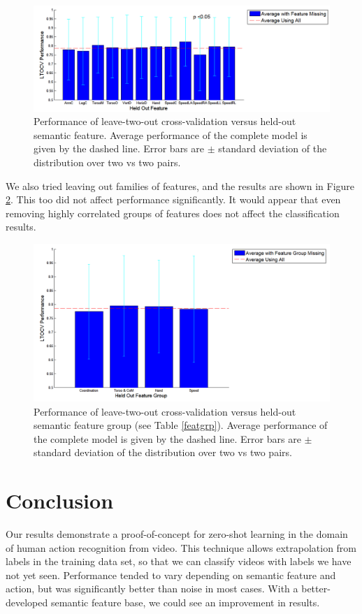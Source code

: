 \documentclass{article}
\begin{document}
\begin{figure}[h]
  \centering
  \includegraphics[width=.9\linewidth]{feature_snap}
  \caption{Performance of leave-two-out cross-validation versus held-out semantic feature. Average performance of the complete model is given by the dashed line. Error bars are $\pm$ standard deviation of the distribution over two vs two pairs.}
  \label{featplot}
\end{figure}

We also tried leaving out families of features, and the results are shown in Figure \ref{featgplot}.  This too did not affect performance significantly. It would appear that even removing highly correlated groups of features does not affect the classification results.

\begin{figure}[h]
  \centering
  \includegraphics[width=.9\linewidth]{featuregrp_snap}
  \caption{Performance of leave-two-out cross-validation versus held-out semantic feature group (see Table \ref{featgrp}). Average performance of the complete model is given by the dashed line. Error bars are $\pm$ standard deviation of the distribution over two vs two pairs.}
  \label{featgplot}
\end{figure}

\section{Conclusion}
Our results demonstrate a proof-of-concept for zero-shot learning in the domain of human action recognition from video. This technique allows extrapolation from labels in the training data set, so that we can classify videos with labels we have not yet seen.  Performance tended to vary depending on semantic feature and action, but was significantly better than noise in most cases. With a better-developed semantic feature base, we could see an improvement in results.



\end{document}

